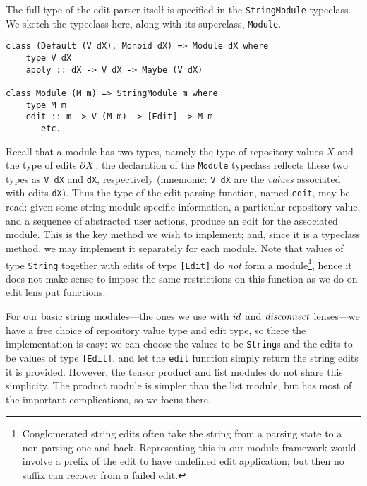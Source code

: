 The full type of the edit parser itself is specified in the
\lstinline!StringModule! typeclass. We sketch the typeclass here, along with
its superclass, \lstinline!Module!.
\begin{lstlisting}
class (Default (V dX), Monoid dX) => Module dX where
	type V dX
	apply :: dX -> V dX -> Maybe (V dX)

class Module (M m) => StringModule m where
	type M m
	edit :: m -> V (M m) -> [Edit] -> M m
	-- etc.
\end{lstlisting}
Recall that a module has two types, namely the type of repository values $X$
and the type of edits $\partial X$; the declaration of the \lstinline!Module!
typeclass reflects these two types as \lstinline!V dX! and \lstinline!dX!,
respectively (mnemonic: \lstinline!V dX! are the \emph{values} associated
with edits \lstinline!dX!). Thus the type of the edit parsing function,
named \lstinline!edit!, may be read: given some string-module specific
information, a particular repository value, and a sequence of abstracted
user actions, produce an edit for the associated module. This is the key
method we wish to implement; and, since it is a typeclass method, we may
implement it separately for each module. Note that values of type
\lstinline!String! together with edits of type \lstinline![Edit]! do
\emph{not} form a module\footnote{Conglomerated string edits often take the
string from a parsing state to a non-parsing one and back. Representing this
in our module framework would involve a prefix of the edit to have undefined
edit application; but then no suffix can recover from a failed edit.}, hence
it does not make sense to impose the same restrictions on this function as
we do on edit lens put functions.

For our basic string modules---the ones we use with $\mathit{id}$ and $\mathit{disconnect}$
lenses---we have a free choice of repository value type and edit type, so
there the implementation is easy: we can choose the values to be
\lstinline!String!s and the edits to be values of type \lstinline![Edit]!,
and let the \lstinline!edit! function simply return the string edits it is
provided. However, the tensor product and list modules do not share this
simplicity. The product module is simpler than the list module, but has most
of the important complications, so we focus there.

